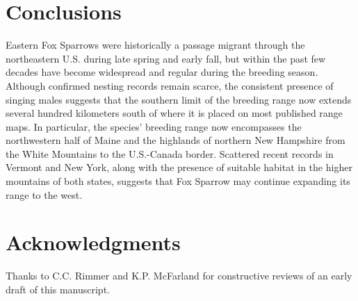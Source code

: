 \documentclass[fleqn,10pt,lineno]{wlpeerj} %
\begin{document}
\section*{Conclusions}
Eastern Fox Sparrows were historically a passage migrant through the northeastern U.S. during late spring and early fall, but within the past few decades have become widespread and regular during the breeding season. Although confirmed nesting records remain scarce, the consistent presence of singing males suggests that the southern limit of the breeding range now extends several hundred kilometers south of where it is placed on most published range maps. In particular, the species’ breeding range now encompasses the northwestern half of Maine and the highlands of northern New Hampshire from the White Mountains to the U.S.-Canada border. Scattered recent records in Vermont and New York, along with the presence of suitable habitat in the higher mountains of both states, suggests that Fox Sparrow may continue expanding its range to the west.

\section*{Acknowledgments}

Thanks to C.C. Rimmer and K.P. McFarland for constructive reviews of an early draft of this manuscript.


\end{document}
